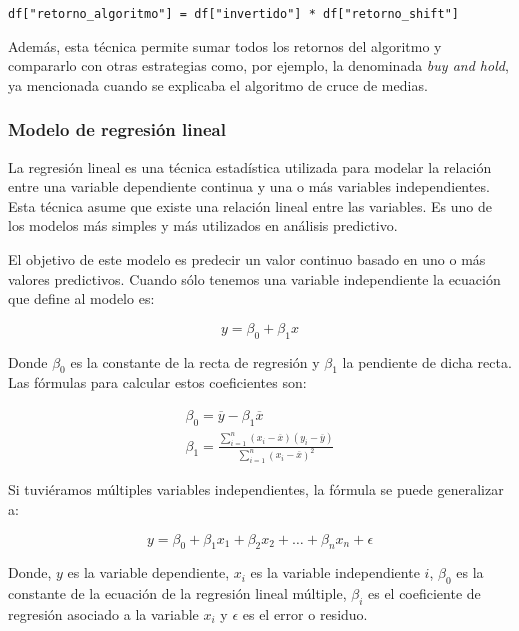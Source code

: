 \begin{verbatim}
df["retorno_algoritmo"] = df["invertido"] * df["retorno_shift"]
\end{verbatim}

Además, esta técnica permite sumar todos los retornos del algoritmo y compararlo con otras estrategias como, por ejemplo, la denominada \emph{buy and hold}, ya mencionada cuando se explicaba el algoritmo de cruce de medias. 


\subsubsection{Modelo de regresión lineal}

La regresión lineal es una técnica estadística utilizada para modelar la relación entre una variable dependiente continua y una o más variables independientes. Esta técnica asume que existe una relación lineal entre las variables. Es uno de los modelos más simples y más utilizados en análisis predictivo. 

El objetivo de este modelo es predecir un valor continuo basado en uno o más valores predictivos. Cuando sólo tenemos una variable independiente la ecuación que define al modelo es:

\begin{equation}
    y = \beta_{0} + \beta_{1}x
\end{equation}

Donde $\beta_{0}$ es la constante de la recta de regresión y $\beta_{1}$ la pendiente de dicha recta. Las fórmulas para calcular estos coeficientes son:

\begin{align}
	\beta_{0} = \overline{y} - \beta_{1}\overline{x} \\
	\beta_{1} = \frac{\sum_{i=1}^{n} (x_{i} - \overline{x})(y_{i}-\overline{y})}{\sum_{i=1}^{n} (x_{i} - \overline{x})^2}
\end{align}

Si tuviéramos múltiples variables independientes, la fórmula se puede generalizar a:

\begin{equation}
    y = \beta_{0} + \beta_{1}x_{1} + \beta_{2}x_{2} + \ldots + \beta_{n}x_{n} + \epsilon
\end{equation}

Donde, $y$ es la variable dependiente, $x_{i}$ es la variable independiente $i$, $\beta_{0}$ es la constante de la ecuación de la regresión lineal múltiple, $\beta_{i}$ es el coeficiente de regresión asociado a la variable $x_{i}$ y $\epsilon$ es el error o residuo. 

